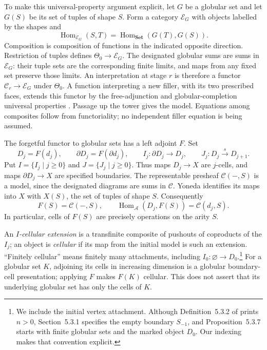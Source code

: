 \documentclass[11pt,letterpaper]{article}
\numberwithin{equation}{section}
\theoremstyle{plain}
\theoremstyle{definition}
\theoremstyle{remark}
\begin{document}
To make this universal-property argument explicit, let $G$ be a globular
set and let $G(S)$ be its set of tuples of shape $S$.  Form a category
$\mathcal E_G$ with objects labelled by the shapes and
\[
 \operatorname{Hom}_{\mathcal E_G}(S,T)=\operatorname{Hom}_{\mathbf{Set}}(G(T),G(S)).
\]
Composition is composition of functions in the indicated opposite
direction.  Restriction of tuples defines $\Theta_0\to\mathcal E_G$.
The designated globular sums are sums in $\mathcal E_G$: their tuple
sets are the corresponding finite limits, and maps from any fixed set
preserve those limits.  An interpretation at stage $r$ is therefore a
functor $\mathcal C_r\to\mathcal E_G$ under $\Theta_0$.  A function
interpreting a new filler, with its two prescribed faces, extends this
functor by the free-adjunction and globular-completion universal
properties \cite[Section~2.9]{Ara2013}.  Passage up the tower gives
the model.  Equations among composites follow from functoriality;
no independent filler equation is being assumed.

The forgetful functor to globular sets has a left adjoint $F$.  Set
\[
 D_j=F(d_j),\qquad \partial D_j=F(\partial d_j),\qquad
 I_j:\partial D_j\longrightarrow D_j,\qquad
 J_j:D_j\xrightarrow{s}D_{j+1}.
\]
Put $I=\{I_j\mid j\ge0\}$ and $J=\{J_j\mid j\ge0\}$.
Thus maps $D_j\to X$ are $j$-cells, and maps $\partial D_j\to X$ are
specified boundaries.  The representable presheaf $\mathcal C(-,S)$ is
a model, since the designated diagrams are sums in $\mathcal C$.
Yoneda identifies its maps into $X$ with $X(S)$, the set of tuples of
shape $S$.  Consequently
\begin{equation}\label{eq:prelim-free-shape}
 F(S)=\mathcal C(-,S),\qquad
 \operatorname{Hom}_{\mathcal A}(D_j,F(S))=\mathcal C(d_j,S).
\end{equation}
In particular, cells of $F(S)$ are precisely operations on the arity $S$.

An \emph{$I$-cellular extension} is a transfinite composite of pushouts
of coproducts of the $I_j$; an object is \emph{cellular} if its map from
the initial model is such an extension.  ``Finitely cellular'' means
finitely many attachments, including $I_0:\varnothing\to D_0$.\footnote{We
include the initial vertex attachment.  Although Definition~5.3.2 of
\cite{Henry2016} prints $n>0$, Section~5.3.1 specifies the empty boundary
$S_{-1}$, and Proposition~5.3.7 starts with finite globular sets and the
marked object $D_0$.  Our indexing makes that convention explicit.}
For a globular set $K$, adjoining its cells in increasing dimension is
a globular boundary-cell presentation; applying $F$ makes $F(K)$
cellular.  This does not assert that its underlying globular set has
only the cells of $K$.
\end{document}
